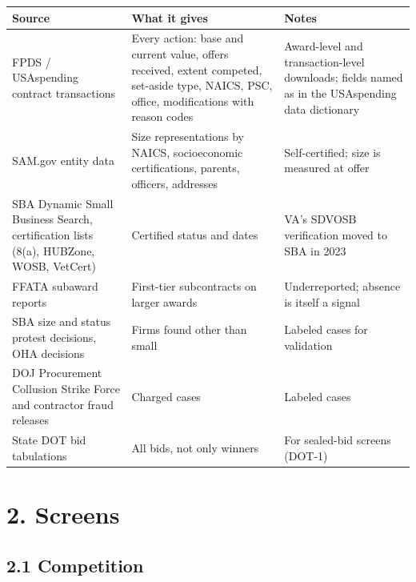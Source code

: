 \documentclass[letterpaper,11pt]{article}
\begin{document}
\begingroup\small\setlength{\tabcolsep}{4pt}\renewcommand{\arraystretch}{1.25}
\begin{longtable}[l]{@{}>{\raggedright\arraybackslash}p{}>{\raggedright\arraybackslash}p{}>{\raggedright\arraybackslash}p{}@{}}
\rowcolor{coolblack}\leavevmode\color{white}\bfseries Source & \leavevmode\color{white}\bfseries What it gives & \leavevmode\color{white}\bfseries Notes \\
\endhead
FPDS / USAspending contract transactions & Every action: base and current value, offers received, extent competed, set-aside type, NAICS, PSC, office, modifications with reason codes & Award-level and transaction-level downloads; fields named as in the USAspending data dictionary \\
SAM.gov entity data & Size representations by NAICS, socioeconomic certifications, parents, officers, addresses & Self-certified; size is measured at offer \\
SBA Dynamic Small Business Search, certification lists (8(a), HUBZone, WOSB, VetCert) & Certified status and dates & VA's SDVOSB verification moved to SBA in 2023 \\
FFATA subaward reports & First-tier subcontracts on larger awards & Underreported; absence is itself a signal \\
SBA size and status protest decisions, OHA decisions & Firms found other than small & Labeled cases for validation \\
DOJ Procurement Collusion Strike Force and contractor fraud releases & Charged cases & Labeled cases \\
State DOT bid tabulations & All bids, not only winners & For sealed-bid screens (DOT-1) \\
\end{longtable}\endgroup

\hypertarget{screens}{%
\section*{2. Screens}\label{screens}}

\hypertarget{competition}{%
\subsection*{2.1 Competition}\label{competition}}
\end{document}
